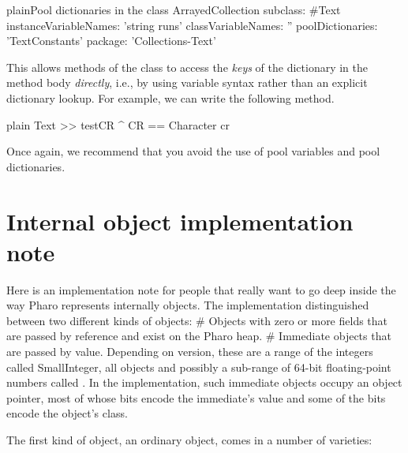 \documentclass[10pt,twoside,english]{_support/latex/sbabook/sbabook}
\begin{document}
\begin{listing}[float, label=scr:textPoolDict]{plain}{Pool dictionaries in the  class}
ArrayedCollection subclass: #Text
        instanceVariableNames: 'string runs'
        classVariableNames: ''
        poolDictionaries: 'TextConstants'
        package: 'Collections-Text'
\end{listing}

This allows methods of the class  to access the \textit{keys} of the
dictionary in the method body \textit{directly}, i.e., by using variable syntax
rather than an explicit dictionary lookup. For example, we can write the
following method.

\begin{listing}[float, label=scr:textTestCR]{plain}{}
Text >> testCR
    ^ CR == Character cr
\end{listing}

Once again, we recommend that you avoid the use of pool variables and pool
dictionaries.
\chapter{Internal object implementation note}
Here is an implementation note for people that really want to go deep inside the
way Pharo represents internally objects. The implementation distinguished
between two different kinds of objects: \# Objects with zero or more fields that
are passed by reference and exist on the Pharo heap. \# Immediate objects that
are passed by value. Depending on version, these are a range of the integers
called SmallInteger, all  objects and possibly a sub-range of
64-bit floating-point numbers called . In the implementation,
such immediate objects occupy an object pointer, most of whose bits encode the
immediate's value and some of the bits encode the object's class.

The first kind of object, an ordinary object, comes in a number of varieties:
\end{document}
